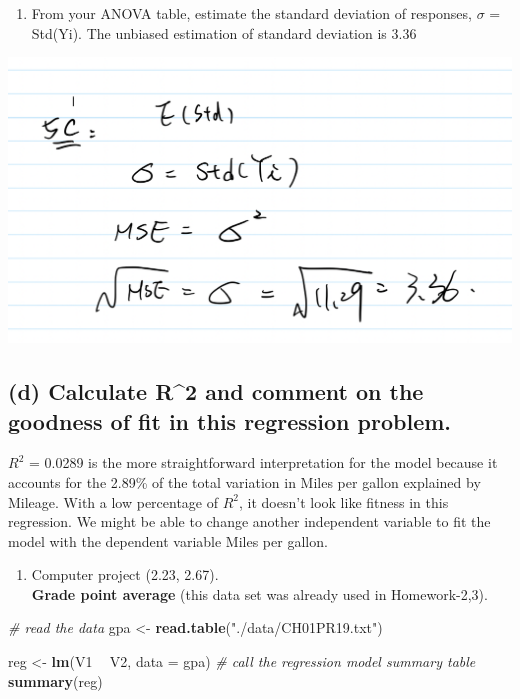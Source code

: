 \documentclass[
]{article}
\newenvironment{Shaded}{\begin{snugshade}}{\end{snugshade}}
\newcommand{\CommentTok}[1]{\textcolor[rgb]{0.56,0.35,0.01}{\textit{#1}}}
\newcommand{\DataTypeTok}[1]{\textcolor[rgb]{0.13,0.29,0.53}{#1}}
\newcommand{\KeywordTok}[1]{\textcolor[rgb]{0.13,0.29,0.53}{\textbf{#1}}}
\newcommand{\NormalTok}[1]{#1}
\newcommand{\OperatorTok}[1]{\textcolor[rgb]{0.81,0.36,0.00}{\textbf{#1}}}
\newcommand{\StringTok}[1]{\textcolor[rgb]{0.31,0.60,0.02}{#1}}
\providecommand{\tightlist}{%
  \setlength{\itemsep}{0pt}\setlength{\parskip}{0pt}}
\begin{document}
\begin{enumerate}
\def\labelenumi{(\alph{enumi})}
\setcounter{enumi}{2}
\tightlist
\item
  From your ANOVA table, estimate the standard deviation of responses,
  \(\sigma\) = Std(Yi). The unbiased estimation of standard deviation is
  3.36
\end{enumerate}

\includegraphics{pics/Screen Shot 2021-02-21 at 8.21.54 PM.png}

\hypertarget{d-calculate-r2-and-comment-on-the-goodness-of-fit-in-this-regression-problem.}{%
\subsection{(d) Calculate R\^{}2 and comment on the goodness of fit in
this regression
problem.}\label{d-calculate-r2-and-comment-on-the-goodness-of-fit-in-this-regression-problem.}}

\(R^2\) = 0.0289 is the more straightforward interpretation for the
model because it accounts for the 2.89\% of the total variation in Miles
per gallon explained by Mileage. With a low percentage of \(R^2\), it
doesn't look like fitness in this regression. We might be able to change
another independent variable to fit the model with the dependent
variable Miles per gallon.

\begin{enumerate}
\def\labelenumi{\arabic{enumi}.}
\setcounter{enumi}{5}
\tightlist
\item
  Computer project (2.23, 2.67).\\
  \textbf{Grade point average} (this data set was already used in
  Homework-2,3).
\end{enumerate}

\begin{Shaded}
\begin{Highlighting}[]
\CommentTok{# read the data}
\NormalTok{gpa <-}\StringTok{ }\KeywordTok{read.table}\NormalTok{(}\StringTok{"./data/CH01PR19.txt"}\NormalTok{)}

\NormalTok{reg <-}\StringTok{ }\KeywordTok{lm}\NormalTok{(V1 }\OperatorTok{~}\StringTok{ }\NormalTok{V2, }\DataTypeTok{data =}\NormalTok{ gpa)}
\CommentTok{# call the regression model summary table}
\KeywordTok{summary}\NormalTok{(reg)}
\end{Highlighting}
\end{Shaded}
\end{document}
